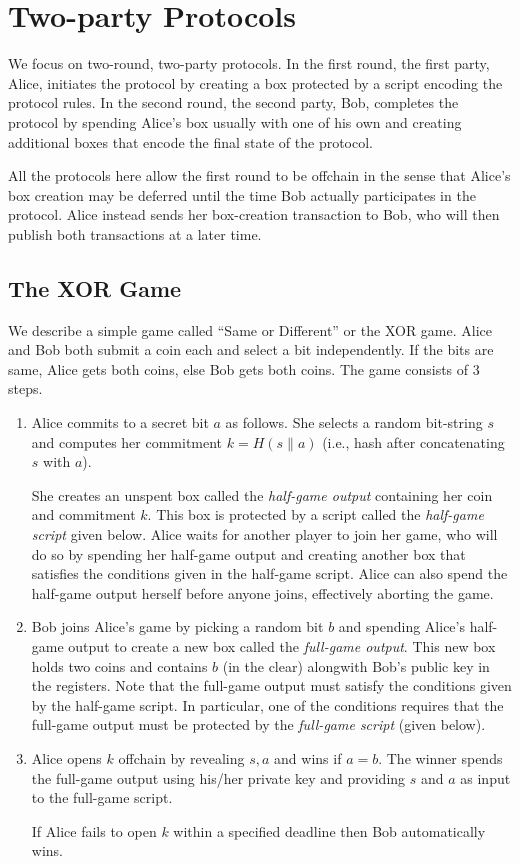 \documentclass[11pt]{article}
\begin{document}
\section{Two-party Protocols}

We focus on two-round, two-party protocols. %
In the first round, the first party, Alice, initiates the protocol by creating a box  protected by a script encoding the protocol rules. In the second round, the second party, Bob, completes the protocol by spending Alice's box usually with one of his own and creating additional boxes that encode the final state of the protocol. 

All the protocols here allow the first round to be offchain in the sense that Alice's box creation may be deferred until the time Bob actually participates in the protocol. Alice instead sends her box-creation transaction to Bob, who will then publish both transactions at a later time. 
\subsection{The XOR Game}

We describe a simple game called ``Same or Different'' or the XOR game. Alice and Bob both submit a coin each and select a bit independently. If the bits are same, Alice gets both coins, else Bob gets both coins. The game consists of 3 steps. 
\begin{enumerate}
	\item Alice commits to a secret bit $a$ as follows. She selects a random bit-string $s$ and computes her commitment $k = H(s\|a)$ (i.e., hash after concatenating $s$ with $a$).
	
	She creates an unspent box called the {\em half-game output} containing her coin and commitment $k$. This box is protected by a script called the {\em half-game script}  given below. Alice waits for another player to join her game, who will do so by spending her half-game output and creating another box that satisfies the conditions given in the half-game script. Alice can also spend the half-game output herself before anyone joins, effectively aborting the game. 
	
	\item Bob joins Alice's game by picking a random bit $b$ and spending Alice's half-game output to create a new box called the {\em full-game output}. This new box  holds two coins and contains $b$ (in the clear) alongwith Bob's public key in the registers. 
	Note that the full-game output must satisfy the conditions given by the half-game script. In particular, one of the conditions requires that the full-game output must be protected by the {\em full-game script} (given below).
	\item Alice opens $k$ offchain by revealing $s, a$ and wins if $a = b$. The winner spends the full-game output using his/her private key and providing $s$ and $a$ as input to the full-game script.

	If Alice fails to open $k$ within a specified deadline then Bob automatically wins. 
\end{enumerate}
\end{document}
